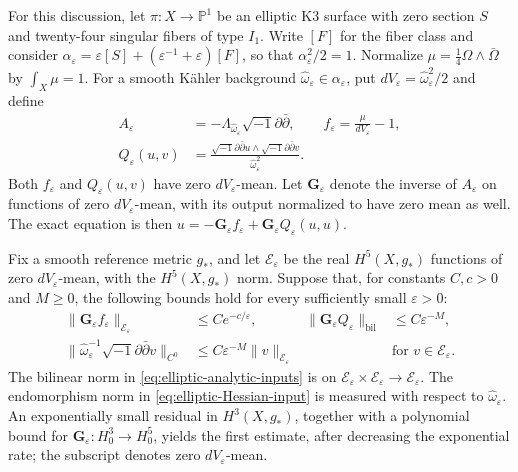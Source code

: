 \documentclass[11pt,a4paper,twoside]{article}
\numberwithin{equation}{section}
\newcommand{\ddc}{\sqrt{-1}\partial\bar\partial}
\theoremstyle{definition}
\theoremstyle{remark}
\newcommand{\ee}{\varepsilon}
\begin{document}
For this discussion, let \(\pi:X\to\mathbb P^1\) be an elliptic
K3 surface with zero
section \(S\) and twenty-four singular fibers of type \(I_1\).
Write \([F]\) for the fiber class and consider
\(\alpha_\ee=\ee[S]+(\ee^{-1}+\ee)[F]\), so that
\(\alpha_\ee^2/2=1\). Normalize
\(\mu=\frac14\Omega\wedge\bar\Omega\) by \(\int_X\mu=1\).
For a smooth K\"ahler background
\(\widehat\omega_\ee\in\alpha_\ee\), put
\(dV_\ee=\widehat\omega_\ee^2/2\) and define
\[
\begin{aligned}
A_\ee&=-\Lambda_{\widehat\omega_\ee}\ddc,
\qquad f_\ee=\frac{\mu}{dV_\ee}-1,\\
Q_\ee(u,v)&=\frac{\ddc u\wedge\ddc v}{\widehat\omega_\ee^2}.
\end{aligned}
\]
Both \(f_\ee\) and \(Q_\ee(u,v)\) have zero \(dV_\ee\)-mean.
Let \(\mathbf G_\ee\) denote the inverse of \(A_\ee\) on
functions of zero \(dV_\ee\)-mean, with its output normalized to
have zero mean as well.
The exact equation is then
\(u=-\mathbf G_\ee f_\ee+\mathbf G_\ee Q_\ee(u,u)\).

Fix a smooth reference metric \(g_*\), and let \(\mathcal E_\ee\)
be the real \(H^5(X,g_*)\) functions of zero \(dV_\ee\)-mean,
with the \(H^5(X,g_*)\) norm. Suppose that, for constants
\(C,c>0\) and \(M\ge0\), the following bounds hold for every
sufficiently small \(\ee>0\):
\begin{align}
\|\mathbf G_\ee f_\ee\|_{\mathcal E_\ee}
&\le Ce^{-c/\ee},
&\|\mathbf G_\ee Q_\ee\|_{\mathrm{bil}}
&\le C\ee^{-M},\label{eq:elliptic-analytic-inputs}\\
\|\widehat\omega_\ee^{-1}\ddc v\|_{C^0}
&\le C\ee^{-M}\|v\|_{\mathcal E_\ee}
&&\text{for }v\in\mathcal E_\ee.\label{eq:elliptic-Hessian-input}
\end{align}
The bilinear norm in \eqref{eq:elliptic-analytic-inputs} is on
\(\mathcal E_\ee\times\mathcal E_\ee\to\mathcal E_\ee\).
The endomorphism norm in \eqref{eq:elliptic-Hessian-input} is
measured with respect to \(\widehat\omega_\ee\).
An exponentially small residual in \(H^3(X,g_*)\), together with a
polynomial bound for \(\mathbf G_\ee:H^3_0\to H^5_0\), yields the first estimate,
after decreasing the exponential rate; the subscript denotes zero
\(dV_\ee\)-mean.
\end{document}

